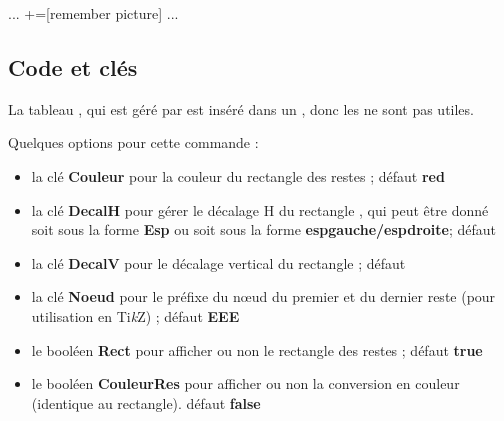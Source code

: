 \documentclass[a4paper,french,11pt]{article}
\providecommand\tikzlogo{Ti\textit{k}Z}
\let\TikZ\tikzlogo
\newcommand\ctex[1]{\tcbox[vignettelatex]{#1}}
\newcommand\Cle[1]{{\bfseries\sffamily\textlangle #1\textrangle}}
\begin{document}
\begin{codetex}
...
+=[remember picture]
...
\end{codetex}

\subsection{Code et clés}

\begin{codetex}[]
\end{codetex}

\begin{codeinfo}
La \og tableau \fg, qui est géré par \ctex{array} est inséré dans un \ctex{ensuremath}, donc les \ctex{\$...\$} ne sont pas utiles.
\end{codeinfo}

\begin{codetex}
\end{codetex}

\begin{codecles}
Quelques options pour cette commande :

\begin{itemize}
	\item la clé \Cle{Couleur} pour la couleur du \og rectangle \fg{} des restes ; \hfill{}défaut \Cle{red}
	\item la clé \Cle{DecalH} pour gérer le décalage H du \og rectangle \fg{}, qui peut être donné soit sous la forme \Cle{Esp} ou soit sous la forme \Cle{espgauche/espdroite}; \hfill{}défaut \Cle{2pt}
	\item la clé \Cle{DecalV} pour le décalage vertical du \og rectangle \fg{} ; \hfill{}défaut \Cle{3pt}
	\item la clé \Cle{Noeud} pour le préfixe du nœud du premier et du dernier reste (pour utilisation en \TikZ) ; \hfill{}défaut \Cle{EEE}
	\item le booléen \Cle{Rect} pour afficher ou non le \og rectangle \fg{} des restes ; \hfill{}défaut \Cle{true}
	\item le booléen \Cle{CouleurRes} pour afficher ou non la conversion en couleur (identique au rectangle). \hfill{}défaut \Cle{false}
\end{itemize}
\end{codecles}
\end{document}
